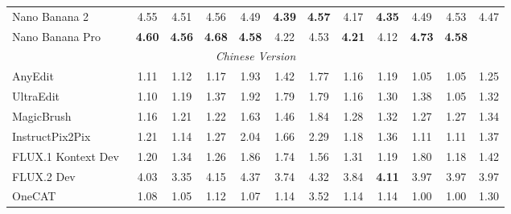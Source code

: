 \documentclass{llmxive}
\begin{document}
\begin{table}[t]
{\begin{tabular}{l|cccccccccc|c}
            Nano Banana 2~\cite{gemini3pro}
            & 4.55 & 4.51 & 4.56 & 4.49 & \textbf{4.39} & \textbf{4.57} & 4.17 & \textbf{4.35} & 4.49 & 4.53
            & \cellcolor[HTML]{C8C8C8} 4.47 \\

            Nano Banana Pro~\cite{nanobananapro}
            & \textbf{4.60} & \textbf{4.56} & \textbf{4.68} & \textbf{4.58} & 4.22 & 4.53 & \textbf{4.21} & 4.12 & \textbf{4.73} & \textbf{4.58}
            & \cellcolor[HTML]{C8C8C8}{\textbf{4.51}} \\

 

            

            \midrule
            \multicolumn{12}{c}{\textit{Chinese Version}} \\
            \midrule

            AnyEdit~\cite{yu2025anyedit}
            & 1.11 & 1.12 & 1.17 & 1.93 & 1.42 & 1.77 & 1.16 & 1.19 & 1.05 & 1.05
            & \cellcolor[HTML]{C8C8C8}1.25 \\

            UltraEdit~\cite{zhao2024ultraedit}
            & 1.10 & 1.19 & 1.37 & 1.92 & 1.79 & 1.79 & 1.16 & 1.30 & 1.38 & 1.05
            & \cellcolor[HTML]{C8C8C8}1.32 \\

            MagicBrush~\cite{zhang2023magicbrush}
            & 1.16 & 1.21 & 1.22 & 1.63 & 1.46 & 1.84 & 1.28 & 1.32 & 1.27 & 1.27
            & \cellcolor[HTML]{C8C8C8}1.34 \\

            InstructPix2Pix~\cite{brooks2023instructpix2pix}
            & 1.21 & 1.14 & 1.27 & 2.04 & 1.66 & 2.29 & 1.18 & 1.36 & 1.11 & 1.11
            & \cellcolor[HTML]{C8C8C8}1.37 \\

            

            FLUX.1 Kontext Dev~\cite{labs2025flux}
            & 1.20 & 1.34 & 1.26 & 1.86 & 1.74 & 1.56 & 1.31 & 1.19 & 1.80 & 1.18
            & \cellcolor[HTML]{C8C8C8}1.42  \\

            FLUX.2 Dev~\cite{flux-2-2025}
            & 4.03 & 3.35 & 4.15 & 4.37 & 3.74 & 4.32 & 3.84 & \textbf{4.11} & 3.97 & 3.97
            & \cellcolor[HTML]{C8C8C8}3.97  \\

            \midrule

            OneCAT~\cite{li2025onecat}
            & 1.08 & 1.05 & 1.12 & 1.07 & 1.14 & 3.52 & 1.14 & 1.14 & 1.00 & 1.00
            & \cellcolor[HTML]{C8C8C8}1.30 \\


\end{tabular}}
\end{table}
\end{document}
